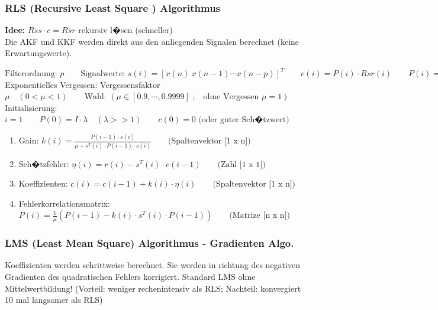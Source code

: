 \subsubsection{RLS (Recursive Least Square ) Algorithmus}
\textbf{Idee:} $Rss \cdot c = Rsr$ rekursiv l�sen (schneller)\\
Die AKF und KKF werden direkt aus den anliegenden Signalen berechnet (keine Erwartungswerte).

$\text{Filterordnung: }p \qquad \text{Signalwerte: } s(i) = [x(n)~x(n-1) \cdots x(n-p)]^T \qquad c(i)=P(i) \cdot Rsr(i) \qquad P(i) = Rss^{-1}(i)$\\
Exponentielles Vergessen: Vergessensfaktor $\mu \quad (0<\mu<1) \qquad \text{Wahl: }(\mu \in [0.9,\cdots,0.9999]\text{ ;} \quad \text{ohne Vergessen } \mu=1)$\\
Initialisierung: $i=1 \qquad P(0) = I\cdot \lambda \quad (\lambda >> 1) \qquad c(0) = 0 \text{ (oder guter Sch�tzwert)}$
\begin{enumerate}
 \item Gain: $k(i) = \frac{P(i-1) \cdot s(i)}{\mu + s^T(i) \cdot P(i-1) \cdot s(i)} \qquad \text{(Spaltenvektor [1 x n])}$
 \item Sch�tzfehler: $\eta(i) = r(i) - s^T(i) \cdot c(i-1) \qquad \text{(Zahl [1 x 1])}$
 \item Koeffizienten: $c(i) = c(i-1) + k(i) \cdot \eta(i) \qquad \text{(Spaltenvektor [1 x n])}$
 \item Fehlerkorrelationsmatrix: $P(i) = \frac{1}{\mu} \left( P(i-1) - k(i) \cdot s^T(i) \cdot P(i-1) \right) \qquad \text{(Matrize [n x n])}$
\end{enumerate}

\subsubsection{LMS (Least Mean Square) Algorithmus - Gradienten Algo.}
Koeffizienten werden schrittweise berechnet. Sie werden in richtung des negativen Gradienten des quadratischen Fehlers korrigiert. Standard LMS ohne Mittelwertbildung!
(Vorteil: weniger rechenintensiv als RLS; Nachteil: konvergiert 10 mal langsamer als RLS)\\

